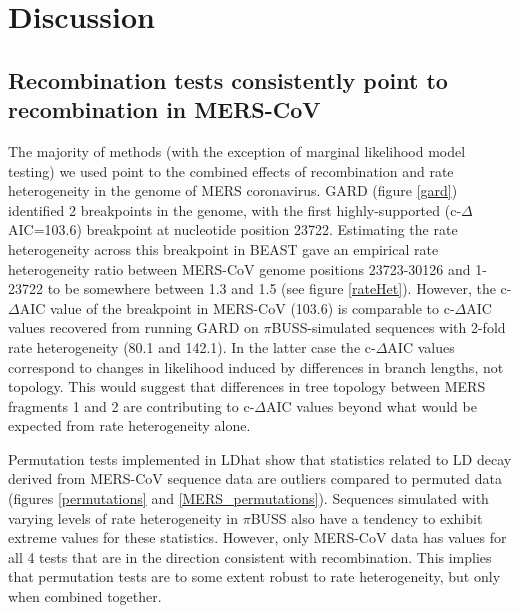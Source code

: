 \documentclass[11pt,oneside,letterpaper]{article}
\begin{document}
\section*{Discussion}
\subsection*{Recombination tests consistently point to recombination in MERS-CoV}
The majority of methods (with the exception of marginal likelihood model testing) we used point to the combined effects of recombination and rate heterogeneity in the genome of MERS coronavirus.
GARD (figure \ref{gard}) identified 2 breakpoints in the genome, with the first highly-supported (c-$\Delta$AIC=103.6) breakpoint at nucleotide position 23722.
Estimating the rate heterogeneity across this breakpoint in BEAST gave an empirical rate heterogeneity ratio between MERS-CoV genome positions 23723-30126 and 1-23722 to be somewhere between 1.3 and 1.5 (see figure \ref{rateHet}).
However, the c-$\Delta$AIC value of the breakpoint in MERS-CoV (103.6) is comparable to c-$\Delta$AIC values recovered from running GARD on $\pi$BUSS-simulated sequences with 2-fold rate heterogeneity (80.1 and 142.1).
In the latter case the c-$\Delta$AIC values correspond to changes in likelihood induced by differences in branch lengths, not topology.
This would suggest that differences in tree topology between MERS fragments 1 and 2 are contributing to c-$\Delta$AIC values beyond what would be expected from rate heterogeneity alone.

Permutation tests implemented in LDhat show that statistics related to LD decay derived from MERS-CoV sequence data are outliers compared to permuted data (figures \ref{permutations} and \ref{MERS_permutations}).
Sequences simulated with varying levels of rate heterogeneity in $\pi$BUSS also have a tendency to exhibit extreme values for these statistics.
However, only MERS-CoV data has values for all 4 tests that are in the direction consistent with recombination.
This implies that permutation tests are to some extent robust to rate heterogeneity, but only when combined together.
\end{document}
